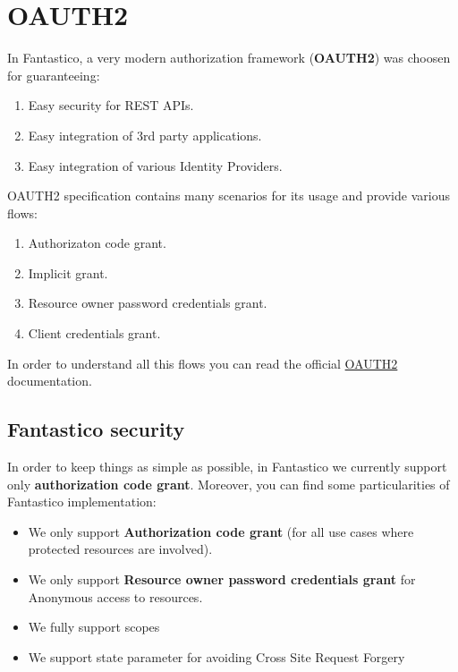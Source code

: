 \documentclass[letterpaper,10pt,english]{sphinxmanual}
\begin{document}
\section{OAUTH2}
\label{features/oauth2:oauth2}\label{features/oauth2::doc}
In Fantastico, a very modern authorization framework (\textbf{OAUTH2}) was choosen for guaranteeing:
\begin{enumerate}
\item {} 
Easy security for REST APIs.

\item {} 
Easy integration of 3rd party applications.

\item {} 
Easy integration of various Identity Providers.

\end{enumerate}

OAUTH2 specification contains many scenarios for its usage and provide various flows:
\begin{enumerate}
\item {} 
Authorizaton code grant.

\item {} 
Implicit grant.

\item {} 
Resource owner password credentials grant.

\item {} 
Client credentials grant.

\end{enumerate}

In order to understand all this flows you can read the official \href{http://tools.ietf.org/pdf/rfc6749.pdf}{OAUTH2}
documentation.


\subsection{Fantastico security}
\label{features/oauth2:fantastico-security}
In order to keep things as simple as possible, in Fantastico we currently support only \textbf{authorization code grant}. Moreover,
you can find some particularities of Fantastico implementation:
\begin{itemize}
\item {} 
We only support \textbf{Authorization code grant} (for all use cases where protected resources are involved).

\item {} 
We only support \textbf{Resource owner password credentials grant} for Anonymous access to resources.

\item {} 
We fully support scopes

\item {} 
We support state parameter for avoiding Cross Site Request Forgery

\end{itemize}
\end{document}

